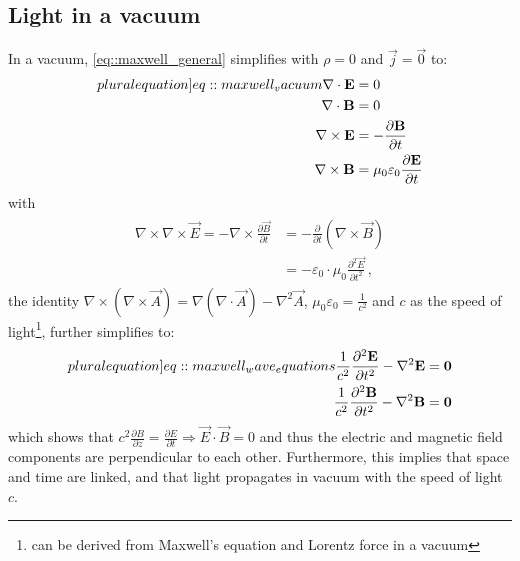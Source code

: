 \subsection{Light in a vacuum}
%
In a vacuum, \cref{eq::maxwell_general} simplifies with $\rho = 0$ and $\vec{j} = \vec{0}$ to:
%
\begin{align}
\begin{split} \label[pluralequation]{eq::maxwell_vacuum}
  \nabla \cdot \vec{E} &= 0 \quad\\
  \nabla \cdot \vec{B} &= 0 \quad\\
  \nabla \times \vec{E} &= -\frac{\partial\vec B}{\partial t}\\
  \nabla \times \vec{B} &= \mu_0\varepsilon_0 \frac{\partial\vec E}{\partial t}
  \end{split}
\end{align}
%
with
\begin{align}
\begin{split}
    \nabla \times \nabla \times \vec{E} = -\nabla \times \frac{\partial \vec{B}} {\partial t} &= -\frac{\partial} {\partial t} \left( \nabla \times  \vec{B} \right)\\
    &= -\varepsilon_0 \cdot \mu_0 \frac{\partial^2 \vec{E}}{\partial t^2} \, ,
\end{split}
\end{align}
%
the identity $\nabla \times \left( \nabla \times \vec{A} \right) = \nabla(\nabla \cdot \vec{A}) - \nabla^{2}\vec{A}$, $\mu_0\varepsilon_0 = \frac{1}{c^2}$ and $c$ as the speed of light\footnote{can be derived from Maxwell's equation and Lorentz force in a vacuum}, further simplifies to:
%
\begin{align}
\begin{split} \label[pluralequation]{eq::maxwell_wave_equations}
  \frac{1}{c^2} \frac{\partial^2 \vec{E}}{\partial t^2} - \nabla^2 \vec{E} &= \vec{0} \\
  \frac{1}{c^2} \frac{\partial^2 \vec{B}}{\partial t^2} - \nabla^2 \vec{B} &= \vec{0}
\end{split}
\end{align}
%
which shows that $c^2 \frac{\partial B} {\partial z} = \frac{\partial E}{\partial t} \Rightarrow \vec{E} \cdot \vec{B} = 0$ and thus the electric and magnetic field components are perpendicular to each other.
Furthermore, this implies that space and time are linked, and that light propagates in vacuum with the speed of light $c$.
% 
% 
%
